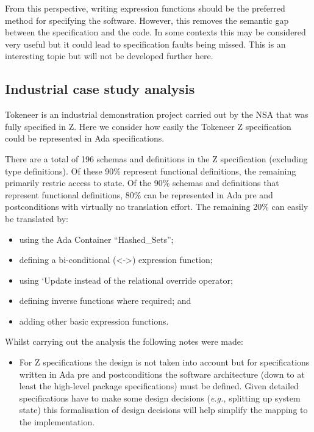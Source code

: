 \documentclass{llncs}
\newcommand{\eg}{\textit{e.g.,}\xspace}
\begin{document}
From this perspective, writing expression functions should be the
preferred method for specifying the software. However, this removes
the semantic gap between the specification and the code. In some
contexts this may be considered very useful but it could lead to
specification faults being missed. This is an interesting topic but
will not be developed further here.

\subsection{Industrial case study analysis}

Tokeneer \cite{tokeneer} is an industrial demonstration project
carried out by the NSA that was fully specified in Z. Here we consider
how easily the Tokeneer Z specification could be represented in Ada
specifications.

There are a total of 196 schemas and definitions in the Z
specification (excluding type definitions). Of these 90\% represent
functional definitions, the remaining primarily restric access to
state. Of the 90\% schemas and definitions that represent functional
definitions, 80\% can be represented in Ada pre and postconditions
with virtually no translation effort. The remaining 20\% can easily be
translated by:

\begin{itemize}
\item using the Ada Container ``Hashed\_Sets'';
\item defining a bi-conditional (<->) expression function;
\item using `Update instead of the relational override operator;
\item defining inverse functions where required; and
\item adding other basic expression functions.
\end{itemize}

Whilst carrying out the analysis the following notes were made:
\begin{itemize}
\item For Z specifications the design is not taken into account but
  for specifications written in Ada pre and postconditions the
  software architecture (down to at least the high-level package
  specifications) must be defined. Given detailed specifications have
  to make some design decisions (\eg splitting up system state) this
  formalisation of design decisions will help simplify the mapping to
  the implementation.
\end{itemize}
\end{document}
